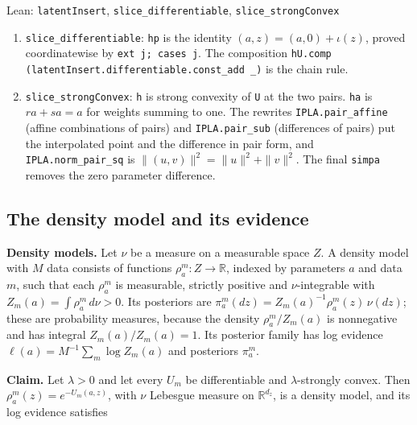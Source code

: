 \documentclass[11pt,a4paper]{report}
\begin{document}
\begin{leanbox}{Lean: \texttt{latentInsert}, \texttt{slice\_\allowbreak{}differentiable}, \texttt{slice\_\allowbreak{}strongConvex}}
\begin{enumerate}


\item \texttt{slice\_\allowbreak{}differentiable}: \texttt{hp} is the identity \((a,z)=(a,0)+\iota(z)\), proved coordinatewise by \texttt{ext j; cases j}. The composition \texttt{h\allowbreak{}U.\allowbreak{}comp (latent\allowbreak{}Insert.\allowbreak{}differentiable.\allowbreak{}const\_\allowbreak{}add \_\allowbreak{})} is the chain rule.

\item \texttt{slice\_\allowbreak{}strong\allowbreak{}Convex}: \texttt{h} is strong convexity of \texttt{U} at the two pairs. \texttt{ha} is \(r a+s a=a\) for weights summing to one. The rewrites \texttt{IPLA.\allowbreak{}pair\_\allowbreak{}affine} (affine combinations of pairs) and \texttt{IPLA.\allowbreak{}pair\_\allowbreak{}sub} (differences of pairs) put the interpolated point and the difference in pair form, and \texttt{IPLA.\allowbreak{}norm\_\allowbreak{}pair\_\allowbreak{}sq} is \(\|(u,v)\|^2=\|u\|^2+\|v\|^2\). The final \texttt{simpa} removes the zero parameter difference.

\end{enumerate}
\end{leanbox}
\subsection{\texorpdfstring{The density model and its evidence}{The density model and its evidence}}


\textbf{Density models.} Let \(\nu\) be a measure on a measurable space \(Z\). A density model with \(M\) data consists of functions \(\rho_a^m:Z\to\mathbb R\), indexed by parameters \(a\) and data \(m\), such that each \(\rho_a^m\) is measurable, strictly positive and \(\nu\)-integrable with \(Z_m(a)=\int\rho_a^m\,d\nu>0\). Its posteriors are \(\pi_a^m(dz)=Z_m(a)^{-1}\rho_a^m(z)\,\nu(dz)\); these are probability measures, because the density \(\rho_a^m/Z_m(a)\) is nonnegative and has integral \(Z_m(a)/Z_m(a)=1\). Its posterior family has log evidence \(\ell(a)=M^{-1}\sum_m\log Z_m(a)\) and posteriors \(\pi_a^m\).




\textbf{Claim.} Let \(\lambda>0\) and let every \(U_m\) be differentiable and \(\lambda\)-strongly convex. Then \(\rho_a^m(z)=e^{-U_m(a,z)}\), with \(\nu\) Lebesgue measure on \(\mathbb R^{d_z}\), is a density model, and its log evidence satisfies
\end{document}
